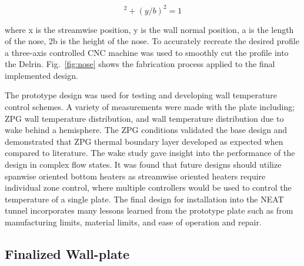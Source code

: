 \begin{equation}
[(a-x)/a]^2 + (y/b)^2 = 1
\label{eq:superEllipse}
\end{equation} 

where x is the streamwise position, y is the wall normal position, a is the length of the nose, 2b is the height of the nose.
To accurately recreate the desired profile a three-axis controlled CNC machine was used to smoothly cut the profile into the Delrin.
Fig.~\ref{fig:nose} shows the fabrication process applied to the final implemented design.

The prototype design was used for testing and developing wall temperature control schemes.
A variety of measurements were made with the plate including; ZPG wall temperature distribution, and wall temperature distribution due to wake behind a hemisphere.
The ZPG conditions validated the base design and demonstrated that ZPG thermal boundary layer developed as expected when compared to literature.
The wake study gave insight into the performance of the design in complex flow states.
It was found that future designs should utilize spanwise oriented bottom heaters as streamwise oriented heaters require individual zone control, where multiple controllers would be used to control the temperature of a single plate.
The final design for installation into the NEAT tunnel incorporates many lessons learned from the prototype plate such as from manufacturing limits, material limits, and ease of operation and repair.

\subsection{Finalized Wall-plate}

